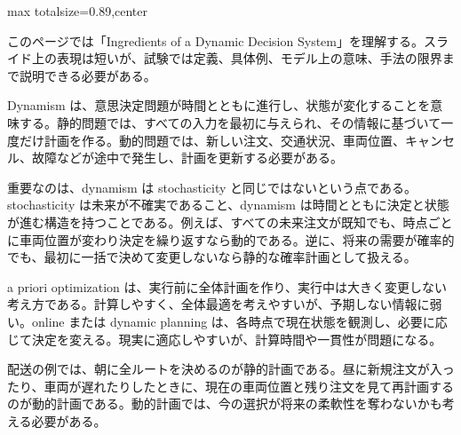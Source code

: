 \begin{minipage}[t]{0.58\textwidth}
\begin{adjustbox}{max totalsize={\textwidth}{0.89\textheight},center}
\begin{minipage}{\textwidth}\scriptsize
{}このページでは「Ingredients of a Dynamic Decision System」を理解する。スライド上の表現は短いが、試験では定義、具体例、モデル上の意味、手法の限界まで説明できる必要がある。\par
Dynamism は、意思決定問題が時間とともに進行し、状態が変化することを意味する。静的問題では、すべての入力を最初に与えられ、その情報に基づいて一度だけ計画を作る。動的問題では、新しい注文、交通状況、車両位置、キャンセル、故障などが途中で発生し、計画を更新する必要がある。\par
重要なのは、dynamism は stochasticity と同じではないという点である。stochasticity は未来が不確実であること、dynamism は時間とともに決定と状態が進む構造を持つことである。例えば、すべての未来注文が既知でも、時点ごとに車両位置が変わり決定を繰り返すなら動的である。逆に、将来の需要が確率的でも、最初に一括で決めて変更しないなら静的な確率計画として扱える。\par
a priori optimization は、実行前に全体計画を作り、実行中は大きく変更しない考え方である。計算しやすく、全体最適を考えやすいが、予期しない情報に弱い。online または dynamic planning は、各時点で現在状態を観測し、必要に応じて決定を変える。現実に適応しやすいが、計算時間や一貫性が問題になる。\par
配送の例では、朝に全ルートを決めるのが静的計画である。昼に新規注文が入ったり、車両が遅れたりしたときに、現在の車両位置と残り注文を見て再計画するのが動的計画である。動的計画では、今の選択が将来の柔軟性を奪わないかも考える必要がある。\par

\end{minipage}
\end{adjustbox}
\end{minipage}
